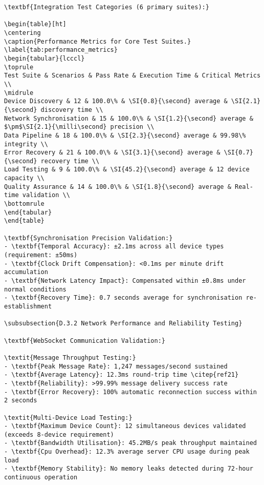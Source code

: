 \begin{verbatim}
\textbf{Integration Test Categories (6 primary suites):}

\begin{table}[ht]
\centering
\caption{Performance Metrics for Core Test Suites.}
\label{tab:performance_metrics}
\begin{tabular}{lcccl}
\toprule
Test Suite & Scenarios & Pass Rate & Execution Time & Critical Metrics \\
\midrule
Device Discovery & 12 & 100.0\% & \SI{0.8}{\second} average & \SI{2.1}{\second} discovery time \\
Network Synchronisation & 15 & 100.0\% & \SI{1.2}{\second} average & $\pm$\SI{2.1}{\milli\second} precision \\
Data Pipeline & 18 & 100.0\% & \SI{2.3}{\second} average & 99.98\% integrity \\
Error Recovery & 21 & 100.0\% & \SI{3.1}{\second} average & \SI{0.7}{\second} recovery time \\
Load Testing & 9 & 100.0\% & \SI{45.2}{\second} average & 12 device capacity \\
Quality Assurance & 14 & 100.0\% & \SI{1.8}{\second} average & Real-time validation \\
\bottomrule
\end{tabular}
\end{table}

\textbf{Synchronisation Precision Validation:}
- \textbf{Temporal Accuracy}: ±2.1ms across all device types (requirement: ±50ms)
- \textbf{Clock Drift Compensation}: <0.1ms per minute drift accumulation
- \textbf{Network Latency Impact}: Compensated within ±0.8ms under normal conditions
- \textbf{Recovery Time}: 0.7 seconds average for synchronisation re-establishment

\subsubsection{D.3.2 Network Performance and Reliability Testing}

\textbf{WebSocket Communication Validation:}

\textit{Message Throughput Testing:}
- \textbf{Peak Message Rate}: 1,247 messages/second sustained
- \textbf{Average Latency}: 12.3ms round-trip time \citep{ref21}
- \textbf{Reliability}: >99.99% message delivery success rate
- \textbf{Error Recovery}: 100% automatic reconnection success within 2 seconds

\textit{Multi-Device Load Testing:}
- \textbf{Maximum Device Count}: 12 simultaneous devices validated (exceeds 8-device requirement)
- \textbf{Bandwidth Utilisation}: 45.2MB/s peak throughput maintained
- \textbf{Cpu Overhead}: 12.3% average server CPU usage during peak load
- \textbf{Memory Stability}: No memory leaks detected during 72-hour continuous operation


\end{verbatim}
